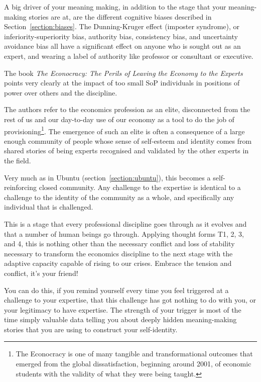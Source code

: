 A big driver of your meaning making, in addition to the stage that your meaning\hyp{}making stories are at, are the different cognitive biases described in Section~\ref{section:biases}. 
The Dunning-Kruger effect (imposter syndrome),  or inferiority-superiority bias,  authority bias, consistency bias, and uncertainty avoidance bias all have a significant effect on anyone who is sought out as an expert, and wearing a label of authority like professor or consultant or executive.


The book \emph{The Econocracy: The Perils of Leaving the Economy to the Experts}\cite{earl-econocracy} points  very clearly at the impact of too small SoP  individuals in positions of power over others and the discipline. 


The authors refer to the economics profession as an elite, disconnected from the rest of us and our day-to-day use of our economy as a tool to do the job of provisioning\footnote{The Econocracy is one of many tangible and transformational outcomes that emerged from the global dissatisfaction, beginning around 2001, of economic students with the validity of what they were being taught.}. The emergence of such an elite is often a consequence of a large enough community of people whose sense of self-esteem and identity comes from shared stories of being experts recognised and validated by the other experts in the field. 


Very much as in Ubuntu (section~\ref{section:ubuntu}),  this becomes a self-reinforcing closed community. Any challenge to the expertise is identical to a challenge to the identity of the community as a whole, and specifically any individual that is challenged.


This is a stage that every professional discipline goes through as it evolves and that a number of human beings go through. Applying thought forms T1, 2, 3, and 4, this is  nothing other than the necessary conflict and loss of stability necessary to transform the economics discipline to the next stage with the adaptive capacity capable of rising to our crises. Embrace the tension and conflict, it's your friend! 


You can do this, if you remind yourself every time you feel triggered at a challenge to your expertise, that this challenge has got nothing to do with you, or your legitimacy to have expertise. The strength of your trigger is most of the time simply valuable data telling you about deeply hidden meaning\hyp{}making stories that you are using to construct your self-identity.


